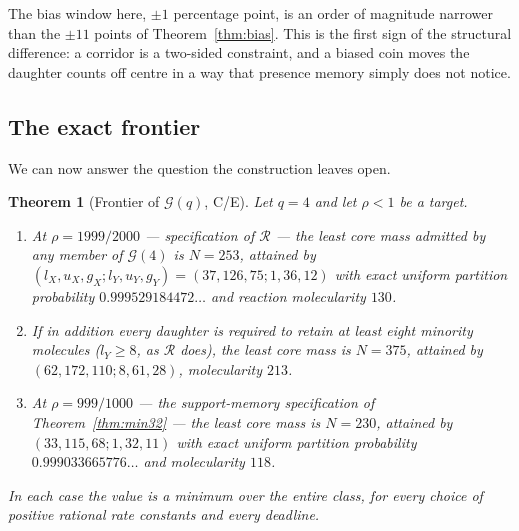\documentclass[11pt]{article}
\theoremstyle{plain}
\newtheorem{theorem}{Theorem}[section]
\theoremstyle{definition}
\theoremstyle{remark}
\begin{document}
The bias window here, $\pm1$ percentage point, is an order of magnitude
narrower than the $\pm11$ points of Theorem~\ref{thm:bias}. This is the first
sign of the structural difference: a corridor is a two-sided constraint, and
a biased coin moves the daughter counts off centre in a way that presence
memory simply does not notice.

\subsection{The exact frontier}

We can now answer the question the construction leaves open.

\begin{theorem}[Frontier of $\mathcal{G}(q)$, C/E]\label{thm:frontier}
Let $q=4$ and let $\rho<1$ be a target.
\begin{enumerate}\itemsep2pt
\item[(i)] At $\rho=1999/2000$ --- specification of $\mathcal{R}$ --- the least core mass admitted by any member of
$\mathcal{G}(4)$ is $N=253$, attained by
$(l_X,u_X,g_X;l_Y,u_Y,g_Y)=(37,126,75;1,36,12)$ with exact uniform partition
probability $0.999529184472\ldots$ and reaction molecularity $130$.
\item[(ii)] If in addition every daughter is required to retain at least eight
minority molecules ($l_Y\ge8$, as $\mathcal{R}$ does), the least
core mass is $N=375$, attained by $(62,172,110;8,61,28)$, molecularity $213$.
\item[(iii)] At $\rho=999/1000$ --- the support-memory specification of
Theorem~\ref{thm:min32} --- the least core mass is $N=230$, attained by
$(33,115,68;1,32,11)$ with exact uniform partition probability
$0.999033665776\ldots$ and molecularity $118$.
\end{enumerate}
In each case the value is a minimum over the entire class, for every choice of
positive rational rate constants and every deadline.
\end{theorem}
\end{document}
